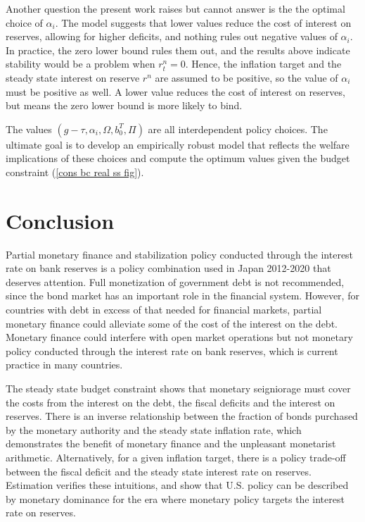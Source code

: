 \documentclass[]{article}
\begin{document}
Another question the present work raises but cannot answer is the the optimal choice of $\alpha_{i}$. The model suggests that lower values reduce the cost of interest on reserves, allowing for higher deficits, and nothing rules out negative values of $\alpha_{i}$. In practice, the zero lower bound rules them out, and the results above indicate stability would be a problem when $r^{n}_{t}=0$. Hence, the inflation target and the steady state interest on reserve $r^{n}$ are assumed to be positive, so the value of $\alpha_{i}$ must be positive as well. A lower value reduces the cost of interest on reserves, but means the zero lower bound is more likely to bind. 

The values $(g-\tau, \alpha_{i}, \Omega, b_{0}^{T},\Pi)$ are all interdependent policy choices. The ultimate goal is to develop an empirically robust model that reflects the welfare implications of these choices and compute the optimum values given the budget constraint (\ref{cons bc real ss fig}).

\section{Conclusion}

Partial monetary finance and stabilization policy conducted through the interest rate on bank reserves is a policy combination used in Japan 2012-2020 that deserves attention. Full monetization of government debt is not recommended, since the bond market has an important role in the financial system. However, for countries with debt in excess of that needed for financial markets, partial monetary finance could alleviate some of the cost of the interest on the debt. Monetary finance could interfere with open market operations but not monetary policy conducted through the interest rate on bank reserves, which is current practice in many countries.

The steady state budget constraint shows that monetary seigniorage must cover the costs from the interest on the debt, the fiscal deficits and the interest on reserves. There is an inverse relationship between the fraction of bonds purchased by the monetary authority and the steady state inflation rate, which demonstrates the benefit of monetary finance and the unpleasant monetarist arithmetic. Alternatively, for a given inflation target, there is a policy trade-off between the fiscal deficit and the steady state interest rate on reserves. Estimation verifies these intuitions, and show that U.S. policy can be described by monetary dominance for the era where monetary policy targets the interest rate on reserves.
\end{document}
